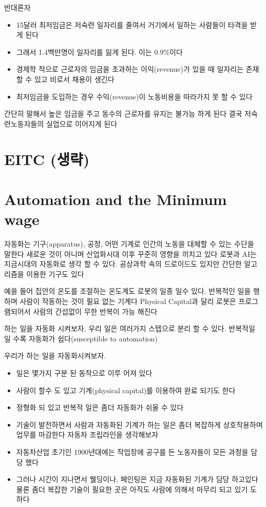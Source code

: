 \documentclass[
]{book}
\providecommand{\tightlist}{%
  \setlength{\itemsep}{0pt}\setlength{\parskip}{0pt}}
\begin{document}
반대론자

\begin{itemize}
\tightlist
\item
  15달러 최저임금은 저숙련 일자리를 줄여서 거기에서 일하는 사람들이 타격을 받게 된다
\item
  그래서 1.4백만명이 일자리를 잃게 된다. 이는 0.9\%이다
\item
  경제학 적으로 근로자의 임금을 초과하는 이익(revenue)가 있을 때 일자리는 존재 할 수 있고 비로서 채용이 생긴다
\item
  최저임금을 도입하는 경우 수익(revenue)이 노동비용을 따라가지 못 할 수 있다
\end{itemize}

간단히 말해서 높은 임금을 주고 동수의 근로자를 유지는 불가능 하게 된다
결국 저숙련노동자들의 실업으로 이어지게 된다

\hypertarget{eitc-uxc0dduxb7b5}{%
\section{EITC (생략)}\label{eitc-uxc0dduxb7b5}}

\hypertarget{automation-and-the-minimum-wage-1}{%
\section{Automation and the Minimum wage}\label{automation-and-the-minimum-wage-1}}

자동화는 기구(apparatus), 공정, 어떤 기계로 인간의 노동을 대체할 수 있는 수단을 말한다
새로운 것이 아니며 산업화시대 이후 꾸준히 영향을 끼치고 있다
로봇과 AI는 지금시대의 자동화로 생각 할 수 있다. 공상과학 속의 드로이드도 있지만 간단한 알고리즘을 이용한 기구도 있다

예을 들어 집안의 온도를 조절하는 온도계도 로봇의 일종 일수 있다. 반복적인 일을 행하며 사람이 작동하는 것이 필요 없는 기계다
Physical Capital과 달리 로봇은 프로그램되어서 사람의 간섭없이 무한 반복이 가능 해진다

하는 일을 자동화 시켜보자, 우리 일은 여러가지 스텝으로 분리 할 수 있다. 반복적일 일 수록 자동화가 쉽다(susceptible to automation)

우리가 하는 일을 자동화시켜보자.

\begin{itemize}
\tightlist
\item
  일은 몇가지 구분 된 동작으로 이루 어져 있다
\item
  사람이 할수 도 있고 기계(physical capital)를 이용하여 완료 되기도 한다
\item
  정형화 되 있고 반복적 일은 좀더 자동화가 쉬울 수 있다
\item
  기술이 발전하면서 사람과 자동화된 기계가 하는 일은 좀더 복잡하게 상호작용하며 업무를 마감한다
  자동차 조립라인을 생각해보자
\item
  자동차산업 초기인 1900년대에는 작업장에 공구를 든 노동자들이 모든 과정을 담당 했다
\item
  그러나 시간이 지나면서 웰딩이나, 페인팅은 지금 자동화된 기계가 담당 하고있다
  물론 좀더 복잡한 기술이 필요한 곳은 아직도 사람에 의해서 마무리 되고 있기 도 하다
\end{itemize}
\end{document}
